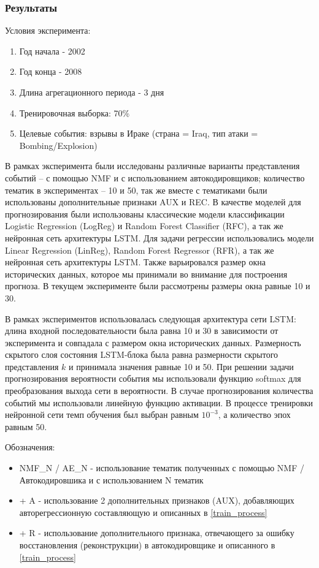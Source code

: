 \subsubsection{Результаты}
Условия эксперимента:
\begin{enumerate}
    \item Год начала - 2002
    \item Год конца - 2008
    \item Длина агрегационного периода - 3 дня
    \item Тренировочная выборка: 70\%
    \item Целевые события: взрывы в Ираке (страна = Iraq, тип атаки = Bombing/Explosion)
\end{enumerate}
В рамках эксперимента были исследованы различные варианты представления событий -- с помощью NMF и с использованием автокодировщиков; количество тематик в экспериментах -- 10 и 50, так же вместе с тематиками были использованы дополнительные признаки AUX и REC.
В качестве моделей для прогнозирования были использованы классические модели классификации Logistic Regression (LogReg) и Random Forest Classifier (RFC), а так же нейронная сеть архитектуры LSTM.
Для задачи регрессии использовались модели Linear Regression (LinReg), Random Forest Regressor (RFR), а так же нейронная сеть архитектуры LSTM. Также варьировался размер окна исторических данных, которое мы принимали во внимание для построения прогноза. В текущем эксперименте были рассмотрены размеры окна равные 10 и 30.

В рамках экспериментов использовалась следующая архитектура сети LSTM: длина входной последовательности была равна 10 и 30 в зависимости от эксперимента и совпадала с размером окна исторических данных. Размерность скрытого слоя состояния LSTM-блока была равна размерности скрытого представления $k$ и принимала значения равные 10 и 50. При решении задачи прогнозирования вероятности события мы использовали функцию softmax для преобразования выхода сети в вероятности. В случае прогнозирования количества событий мы использовали линейную функцию активации. В процессе тренировки нейронной сети темп обучения был выбран равным $10^{-3}$, а количество эпох равным 50.

Обозначения:
\begin{itemize}
    \item  NMF\_N / AE\_N - использование тематик полученных с помощью NMF / Автокодировшика и с использованием N тематик
    \item + A - использование 2 дополнительных признаков (AUX), добавляющих авторегрессионную составляющую и описанных в \ref{train_process}
    \item + R - использование дополнительного признака, отвечающего за ошибку восстановления (реконструкции) в автокодировщике и описанного в \ref{train_process}
\end{itemize}


